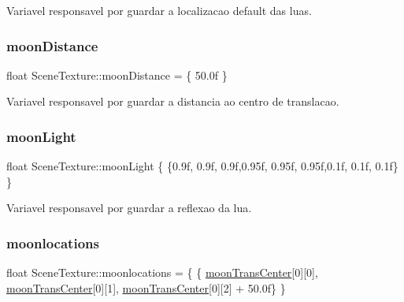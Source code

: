 Variavel responsavel por guardar a localizacao default das luas. 

\mbox{\label{class_scene_texture_abb843fec1a05d24bb5ae6a9795cab5c7}} 
\subsubsection{\texorpdfstring{moonDistance}{moonDistance}}
{\footnotesize\ttfamily float Scene\+Texture\+::moon\+Distance = \{ 50.\+0f \}\hspace{0.3cm}{\ttfamily [static]}}



Variavel responsavel por guardar a distancia ao centro de translacao. 

\mbox{\label{class_scene_texture_ab73f47bec9999c6183e98279b5d29be6}} 
\subsubsection{\texorpdfstring{moonLight}{moonLight}}
{\footnotesize\ttfamily float Scene\+Texture\+::moon\+Light \{ \{0.\+9f, 0.\+9f, 0.\+9f,0.\+95f, 0.\+95f, 0.\+95f,0.\+1f, 0.\+1f, 0.\+1f\} \}\hspace{0.3cm}{\ttfamily [static]}}



Variavel responsavel por guardar a reflexao da lua. 

\mbox{\label{class_scene_texture_a1b2d81b63010dd6d8ec1022e097eb7c3}} 
\subsubsection{\texorpdfstring{moonlocations}{moonlocations}}
{\footnotesize\ttfamily float Scene\+Texture\+::moonlocations = \{ \{ \mbox{\hyperlink{class_scene_texture_a116f1f15f385d94dee75092b2feaa20c}{moon\+Trans\+Center}}\mbox{[}0\mbox{]}\mbox{[}0\mbox{]}, \mbox{\hyperlink{class_scene_texture_a116f1f15f385d94dee75092b2feaa20c}{moon\+Trans\+Center}}\mbox{[}0\mbox{]}\mbox{[}1\mbox{]}, \mbox{\hyperlink{class_scene_texture_a116f1f15f385d94dee75092b2feaa20c}{moon\+Trans\+Center}}\mbox{[}0\mbox{]}\mbox{[}2\mbox{]} + 50.\+0f\} \}\hspace{0.3cm}{\ttfamily [static]}}



